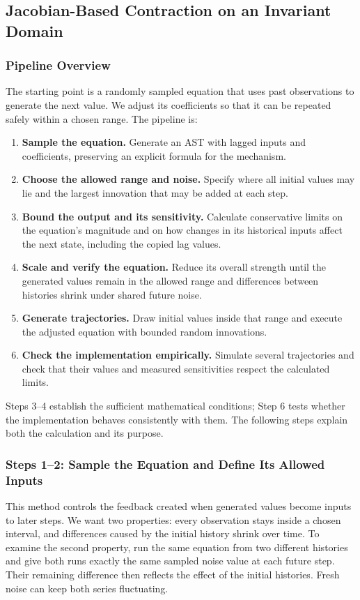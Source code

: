 \subsection{Jacobian-Based Contraction on an Invariant Domain}
\label{sec:implemented-domain-contraction}

\subsubsection{Pipeline Overview}
The starting point is a randomly sampled equation that uses past observations
to generate the next value. We adjust its coefficients so that it can be
repeated safely within a chosen range. The pipeline is:
\begin{enumerate}
\item \textbf{Sample the equation.} Generate an AST with lagged inputs and
coefficients, preserving an explicit formula for the mechanism.
\item \textbf{Choose the allowed range and noise.} Specify where all initial
values may lie and the largest innovation that may be added at each step.
\item \textbf{Bound the output and its sensitivity.} Calculate conservative
limits on the equation's magnitude and on how changes in its historical
inputs affect the next state, including the copied lag values.
\item \textbf{Scale and verify the equation.} Reduce its overall strength
until the generated values remain in the allowed range and differences
between histories shrink under shared future noise.
\item \textbf{Generate trajectories.} Draw initial values inside that range
and execute the adjusted equation with bounded random innovations.
\item \textbf{Check the implementation empirically.} Simulate several
trajectories and check that their values and measured sensitivities respect
the calculated limits.
\end{enumerate}
Steps 3--4 establish the sufficient mathematical conditions; Step 6 tests
whether the implementation behaves consistently with them. The following
steps explain both the calculation and its purpose.

\subsubsection{Steps 1--2: Sample the Equation and Define Its Allowed Inputs}
This method controls the feedback created when generated values become inputs
to later steps. We want two properties: every observation stays inside a
chosen interval, and differences caused by the initial history shrink over
time. To examine the second property, run the same equation from two different
histories and give both runs exactly the same sampled noise value at each
future step. Their remaining difference then reflects the effect of the
initial histories. Fresh noise can keep both series fluctuating.

